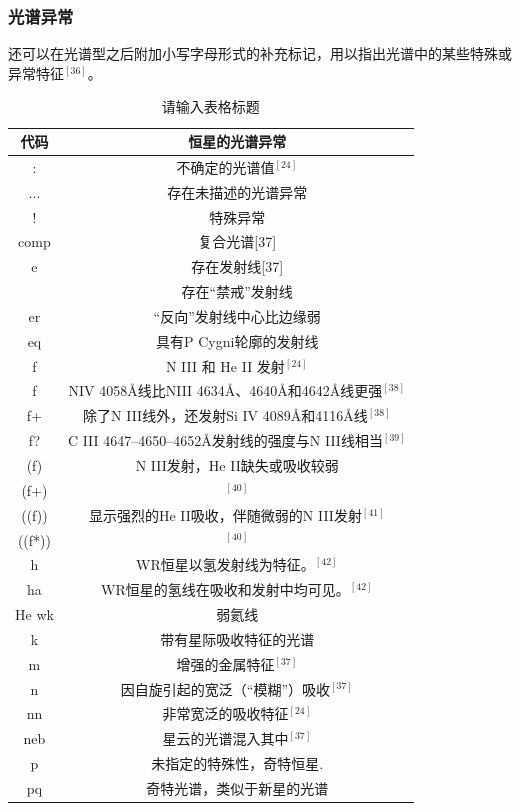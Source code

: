 \subsubsection{光谱异常}
还可以在光谱型之后附加小写字母形式的补充标记，用以指出光谱中的某些特殊或异常特征$^{[36]}$。
\begin{table}[ht]
\centering
\caption{请输入表格标题}\label{tab_Stcl1}
\begin{tabular}{|c|c|}
\hline
\textbf{代码} & \textbf{恒星的光谱异常} \\
\hline
: & 不确定的光谱值$^{[24]}$\\
\hline
... & 存在未描述的光谱异常\\
\hline
! & 特殊异常\\
\hline
comp & 复合光谱[37]\\
\hline
e & 存在发射线[37]\\
\hline
[e] & 存在“禁戒”发射线\\
\hline
er & “反向”发射线中心比边缘弱\\
\hline
eq & 具有P Cygni轮廓的发射线\\
\hline
f & N III 和 He II 发射$^{[24]}$\\
\hline
f & NIV 4058Å线比NIII 4634Å、4640Å和4642Å线更强$^{[38]}$\\
\hline
f+ & 除了N III线外，还发射Si IV 4089Å和4116Å线$^{[38]}$\\
\hline
f? & C III 4647–4650–4652Å发射线的强度与N III线相当$^{[39]}$\\
\hline
(f) & N III发射，He II缺失或吸收较弱\\
\hline
(f+) & $^{[40]}$\\
\hline
((f)) & 显示强烈的He II吸收，伴随微弱的N III发射$^{[41]}$\\
\hline
((f*)) & $^{[40]}$\\
\hline
h & WR恒星以氢发射线为特征。$^{[42]}$\\
\hline
ha & WR恒星的氢线在吸收和发射中均可见。$^{[42]}$\\
\hline
He wk & 弱氦线\\
\hline
k & 带有星际吸收特征的光谱\\
\hline
m & 增强的金属特征$^{[37]}$\\
\hline
n & 因自旋引起的宽泛（“模糊”）吸收$^{[37]}$\\
\hline
nn & 非常宽泛的吸收特征$^{[24]}$\\
\hline
neb & 星云的光谱混入其中$^{[37]}$\\
\hline
p & 未指定的特殊性，奇特恒星.\\
\hline
pq & 奇特光谱，类似于新星的光谱\\

\end{tabular}
\end{table}
